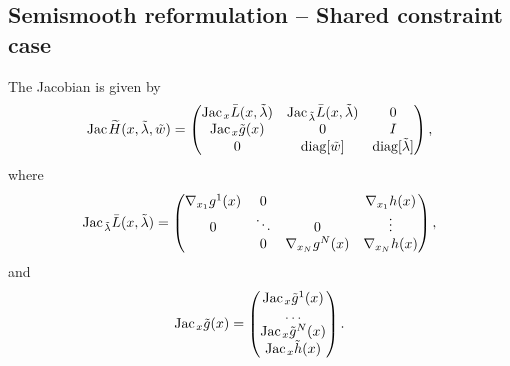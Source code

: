\documentclass[11pt]{article}
\newcommand{\diag}{\textrm{diag}}
\newcommand{\Jac}{\textrm{Jac\hskip+.1em}}
\begin{document}
\subsection{Semismooth reformulation -- Shared constraint case\label{app:ceq:jointcase}}
The Jacobian is given by 
$$
\Jac \widetilde H(x, \tilde \lambda, \tilde w) = 
\left( 
\begin{matrix}
\Jac_x \bar L (x, \tilde \lambda)  & \Jac_{\tilde \lambda} \bar L (x, \tilde \lambda)    & 0 \\
\Jac_x \tilde g(x) & 0 & I \\
0 & \diag[\tilde w] & \diag[\tilde \lambda]
\end{matrix}
\right),
$$
where
$$
\Jac_{\tilde \lambda} \bar L (x, \tilde \lambda) 
=
\left( 
\begin{matrix}
\nabla_{x_1} g^1(x) & 0 &  & \nabla_{x_1} h(x) \\
0 & \ddots & 0 & \vdots \\
 & 0 & \nabla_{x_N} g^N(x) & \nabla_{x_N} h(x) \\
\end{matrix}
\right),
$$
and
$$
\Jac_x \tilde g(x) =
\left( 
\begin{matrix}
\Jac_x \tilde g^1(x) \\ 
\dots \\ 
\Jac_x \tilde g^N(x) \\ 
\Jac_x \tilde h(x) 
\end{matrix}
\right).
$$
\end{document}

